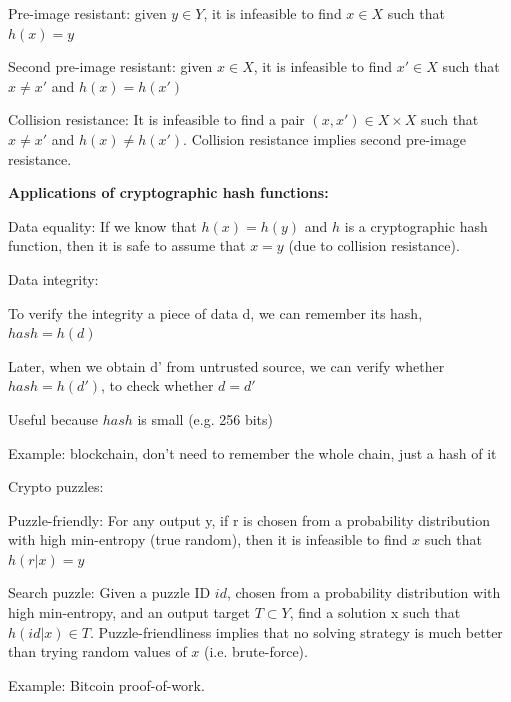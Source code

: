 \documentclass[11pt,oneside,a4paper]{article}
\begin{document}
\begin{compactitem}
	\item Pre-image resistant: given $y \in Y$, it is infeasible to find $x \in X$ such that $h(x) = y$
	\item Second pre-image resistant: given $x \in X$, it is infeasible to find $x' \in X$ such that $x \neq x'$ and $h(x) = h(x')$
	\item Collision resistance: It is infeasible to find a pair $(x,x') \in X \times X$ such that $x \neq x'$ and $h(x) \neq h(x')$. Collision resistance implies second pre-image resistance.\\
\end{compactitem}

\textbf{Applications of cryptographic hash functions:}

\begin{compactitem}
	\item Data equality: If we know that $h(x) = h(y)$ and $h$ is a cryptographic hash function, then it is safe to assume that $x = y$ (due to collision resistance).
	\item Data integrity:
	\begin{compactitem}
		\item To verify the integrity a piece of data d, we can remember its hash, $hash = h(d)$
		\item Later, when we obtain d' from untrusted source, we can verify whether $hash = h(d')$, to check whether $d = d'$
		\item Useful because $hash$ is small (e.g. 256 bits)
	\end{compactitem}
	Example: blockchain, don't need to remember the whole chain, just a hash of it
	\item Crypto puzzles:
	\begin{compactitem}
		\item Puzzle-friendly: For any output y, if r is chosen from a probability distribution with high min-entropy (true random), then it is infeasible to find $x$ such that $h(r|x) = y$
		\item Search puzzle: Given a puzzle ID $id$, chosen from a probability distribution with high min-entropy, and an output target $T \subset Y$, find a solution x such that $h(id|x) \in T$. Puzzle-friendliness implies that no solving strategy is much better than trying random values of $x$ (i.e. brute-force).
	\end{compactitem}
	Example: Bitcoin proof-of-work.
\end{compactitem}
\end{document}
